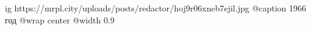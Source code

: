  
 
 
 
 

\ifcmt
  ig https://mrpl.city/uploads/posts/redactor/hoj9r06xneb7ejil.jpg
	@caption 1966 год
  @wrap center
  @width 0.9
\fi
